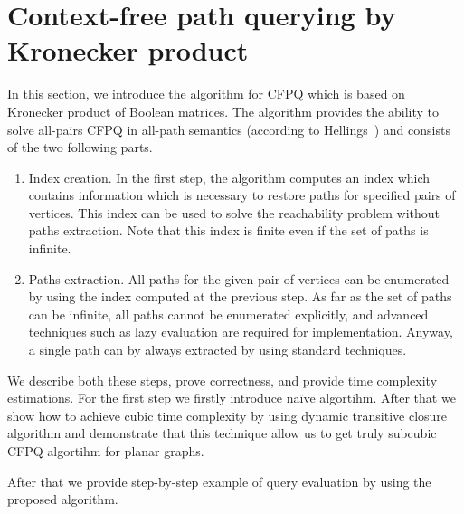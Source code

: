 \section{Context-free path querying by Kronecker product}


In this section, we introduce the algorithm for CFPQ which is based on Kronecker product of Boolean matrices. 
The algorithm provides the ability to solve all-pairs CFPQ in all-path semantics (according to Hellings~\cite{hellingsPathQuerying}) and consists of the two following parts. 
\begin{enumerate}
\item Index creation. In the first step, the algorithm computes an index which contains information which is necessary to restore paths for specified pairs of vertices. This index can be used to solve the reachability problem without paths extraction. Note that this index is finite even if the set of paths is infinite.
\item Paths extraction. All paths for the given pair of vertices can be enumerated by using the index computed at the previous step. As far as the set of paths can be infinite, all paths cannot be enumerated explicitly, and advanced techniques such as lazy evaluation are required for implementation. Anyway, a single path can by always extracted by using standard techniques.
\end{enumerate}

We describe both these steps, prove correctness, and provide time complexity estimations. 
For the first step we firstly introduce na{\"i}ve algortihm. After that we show how to achieve cubic time complexity by using dynamic transitive closure algorithm and demonstrate that this technique allow us to get truly subcubic CFPQ algortihm for planar graphs.

After that we provide step-by-step example of query evaluation by using the proposed algorithm.



